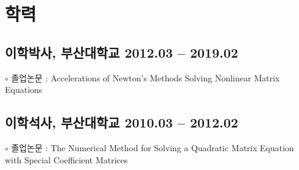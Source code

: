 \documentclass[11pt]{article} %
\begin{document}

%


\section*{학력}

\subsection*{이학박사, 부산대학교 \hfill 2012.03 -- 2019.02} %
$\circ$ 졸업논문 : Accelerations of Newton's Methods Solving Nonlinear Matrix Equations

\subsection*{이학석사, 부산대학교 \hfill 2010.03 -- 2012.02} %
$\circ$ 졸업논문 : The Numerical Method for Solving a Quadratic Matrix Equation with Special Coefficient Matrices

\end{document}
